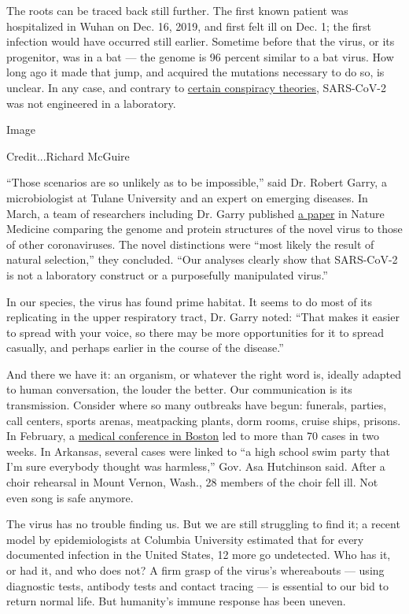 The roots can be traced back still further. The first known patient was
hospitalized in Wuhan on Dec. 16, 2019, and first felt ill on Dec. 1;
the first infection would have occurred still earlier. Sometime before
that the virus, or its progenitor, was in a bat --- the genome is 96
percent similar to a bat virus. How long ago it made that jump, and
acquired the mutations necessary to do so, is unclear. In any case, and
contrary to
\href{https://www.nytimes.com/2020/03/13/world/asia/coronavirus-china-conspiracy-theory.html}{certain
conspiracy theories}, SARS-CoV-2 was not engineered in a laboratory.

Image

Credit...Richard McGuire

``Those scenarios are so unlikely as to be impossible,'' said Dr. Robert
Garry, a microbiologist at Tulane University and an expert on emerging
diseases. In March, a team of researchers including Dr. Garry published
\href{https://www.nature.com/articles/S41591-020-0820-9}{a paper} in
Nature Medicine comparing the genome and protein structures of the novel
virus to those of other coronaviruses. The novel distinctions were
``most likely the result of natural selection,'' they concluded. ``Our
analyses clearly show that SARS-CoV-2 is not a laboratory construct or a
purposefully manipulated virus.''

In our species, the virus has found prime habitat. It seems to do most
of its replicating in the upper respiratory tract, Dr. Garry noted:
``That makes it easier to spread with your voice, so there may be more
opportunities for it to spread casually, and perhaps earlier in the
course of the disease.''

And there we have it: an organism, or whatever the right word is,
ideally adapted to human conversation, the louder the better. Our
communication is its transmission. Consider where so many outbreaks have
begun: funerals, parties, call centers, sports arenas, meatpacking
plants, dorm rooms, cruise ships, prisons. In February, a
\href{https://www.nytimes.com/2020/04/12/us/coronavirus-biogen-boston-superspreader.html}{medical
conference in Boston} led to more than 70 cases in two weeks. In
Arkansas, several cases were linked to ``a high school swim party that
I'm sure everybody thought was harmless,'' Gov. Asa Hutchinson said.
After a choir rehearsal in Mount Vernon, Wash., 28 members of the choir
fell ill. Not even song is safe anymore.

The virus has no trouble finding us. But we are still struggling to find
it; a recent model by epidemiologists at Columbia University estimated
that for every documented infection in the United States, 12 more go
undetected. Who has it, or had it, and who does not? A firm grasp of the
virus's whereabouts --- using diagnostic tests, antibody tests and
contact tracing --- is essential to our bid to return normal life. But
humanity's immune response has been uneven.

